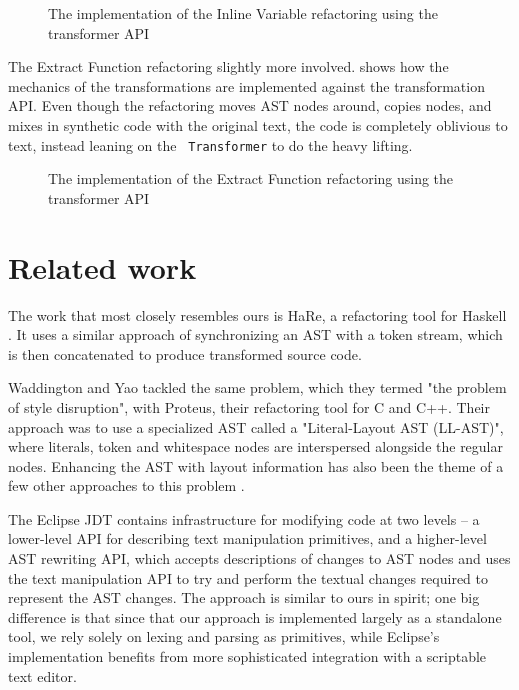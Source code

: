 
\begin{figure}

\caption{The implementation of the Inline Variable refactoring using the transformer API}
\label{Fig:InlineVariable}
\end{figure}

The Extract Function refactoring slightly more involved.
 shows how the mechanics of the transformations are
implemented against the transformation API. Even though the refactoring moves
AST nodes around, copies nodes, and mixes in synthetic code with the original
text, the code is completely oblivious to text, instead leaning on the {\tt
Transformer} to do the heavy lifting.

\begin{figure}

\caption{The implementation of the Extract Function refactoring using the transformer API}
\label{Fig:ExtractFunction}
\end{figure}

\section{Related work}

The work that most closely resembles ours is HaRe, a refactoring tool for
Haskell \cite{HaRe}. It uses a similar approach of synchronizing an AST with a
token stream, which is then concatenated to produce transformed source code.

Waddington and Yao \cite{Proteus} tackled the same problem, which they termed
"the problem of style disruption", with Proteus, their refactoring tool for C
and C++. Their approach was to use a specialized AST called a "Literal-Layout
AST (LL-AST)", where literals, token and whitespace nodes are interspersed
alongside the regular nodes. Enhancing the AST with layout information has also
been the theme of a few other approaches to this problem \cite{RefactorErl}.


The Eclipse JDT contains infrastructure for modifying code at two levels -- a
lower-level API for describing text manipulation primitives, and a higher-level
AST rewriting API, which accepts descriptions of changes to AST nodes and uses
the text manipulation API to try and perform the textual changes required to
represent the AST changes. The approach is similar to ours in spirit; one big
difference is that since that our approach is implemented largely as a
standalone tool, we rely solely on lexing and parsing as primitives, while
Eclipse's implementation benefits from more sophisticated integration with a
scriptable text editor.
